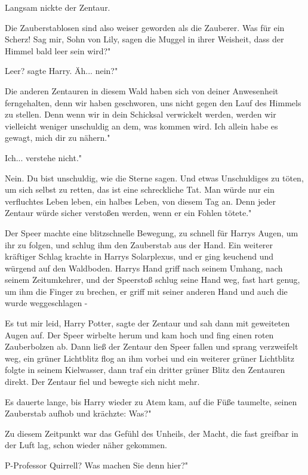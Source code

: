 Langsam nickte der Zentaur.

\glqq{}Die Zauberstablosen sind also weiser geworden als die Zauberer. Was für
ein Scherz! Sag mir, Sohn von Lily, sagen die Muggel in ihrer Weisheit, dass der
Himmel bald leer sein wird?"

\glqq{}Leer?\grqq{} sagte Harry. \glqq{}Äh... nein?"

\glqq{}Die anderen Zentauren in diesem Wald haben sich von deiner Anwesenheit
ferngehalten, denn wir haben geschworen, uns nicht gegen den Lauf des Himmels zu
stellen. Denn wenn wir in dein Schicksal verwickelt werden, werden wir
vielleicht weniger unschuldig an dem, was kommen wird. Ich allein habe es
gewagt, mich dir zu nähern."

\glqq{}Ich... verstehe nicht."

\glqq{}Nein. Du bist unschuldig, wie die Sterne sagen. Und etwas Unschuldiges zu
töten, um sich selbst zu retten, das ist eine schreckliche Tat. Man würde nur
ein verfluchtes Leben leben, ein halbes Leben, von diesem Tag an. Denn jeder
Zentaur würde sicher verstoßen werden, wenn er ein Fohlen tötete."

Der Speer machte eine blitzschnelle Bewegung, zu schnell für Harrys Augen, um
ihr zu folgen, und schlug ihm den Zauberstab aus der Hand. Ein weiterer
kräftiger Schlag krachte in Harrys Solarplexus, und er ging keuchend und würgend
auf den Waldboden. Harrys Hand griff nach seinem Umhang, nach seinem
Zeitumkehrer, und der Speerstoß schlug seine Hand weg, fast hart genug, um ihm
die Finger zu brechen, er griff mit seiner anderen Hand und auch die wurde
weggeschlagen -

\glqq{}Es tut mir leid, Harry Potter\grqq{}, sagte der Zentaur und sah dann mit
geweiteten Augen auf. Der Speer wirbelte herum und kam hoch und fing einen roten
Zauberbolzen ab. Dann ließ der Zentaur den Speer fallen und sprang verzweifelt
weg, ein grüner Lichtblitz flog an ihm vorbei und ein weiterer grüner Lichtblitz
folgte in seinem Kielwasser, dann traf ein dritter grüner Blitz den Zentauren
direkt. Der Zentaur fiel und bewegte sich nicht mehr.

Es dauerte lange, bis Harry wieder zu Atem kam, auf die Füße taumelte, seinen
Zauberstab aufhob und krächzte: \glqq{}Was?"

Zu diesem Zeitpunkt war das Gefühl des Unheils, der Macht, die fast greifbar in
der Luft lag, schon wieder näher gekommen.

\glqq{}P-Professor Quirrell? Was machen Sie denn hier?"

